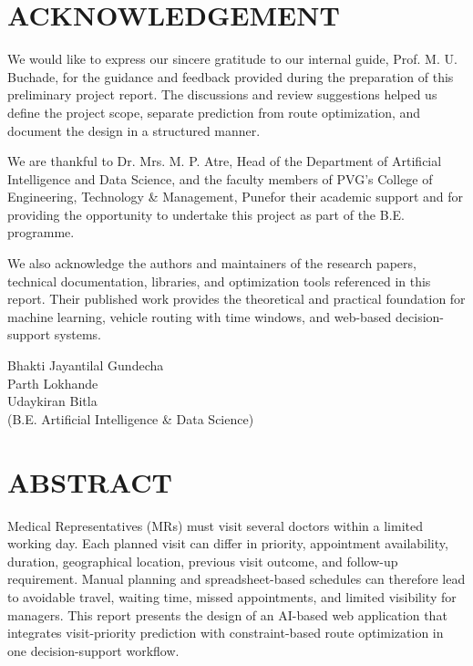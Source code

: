 \documentclass[12pt,a4paper,oneside]{report}
\newcommand{\college}{PVG's College of Engineering, Technology \& Management, Pune}
\newcommand{\guidename}{Prof. M. U. Buchade}
\newcommand{\studentone}{Bhakti Jayantilal Gundecha}
\newcommand{\studenttwo}{Parth Lokhande}
\newcommand{\studentthree}{Udaykiran Bitla}
\begin{document}
\clearpage
\chapter*{ACKNOWLEDGEMENT}
We would like to express our sincere gratitude to our internal guide, \guidename, for the guidance and feedback provided during the preparation of this preliminary project report. The discussions and review suggestions helped us define the project scope, separate prediction from route optimization, and document the design in a structured manner.

We are thankful to Dr. Mrs. M. P. Atre, Head of the Department of Artificial Intelligence and Data Science, and the faculty members of \college for their academic support and for providing the opportunity to undertake this project as part of the B.E. programme.

We also acknowledge the authors and maintainers of the research papers, technical documentation, libraries, and optimization tools referenced in this report. Their published work provides the theoretical and practical foundation for machine learning, vehicle routing with time windows, and web-based decision-support systems.

\vspace{10mm}
\begin{flushright}
\studentone\\
\studenttwo\\
\studentthree\\
(B.E. Artificial Intelligence \& Data Science)
\end{flushright}

\begingroup{}\selectfont\setlength{\parskip}{0.35\baselineskip}
\chapter*{ABSTRACT}
Medical Representatives (MRs) must visit several doctors within a limited working day. Each planned visit can differ in priority, appointment availability, duration, geographical location, previous visit outcome, and follow-up requirement. Manual planning and spreadsheet-based schedules can therefore lead to avoidable travel, waiting time, missed appointments, and limited visibility for managers. This report presents the design of an AI-based web application that integrates visit-priority prediction with constraint-based route optimization in one decision-support workflow.
\end{document}
